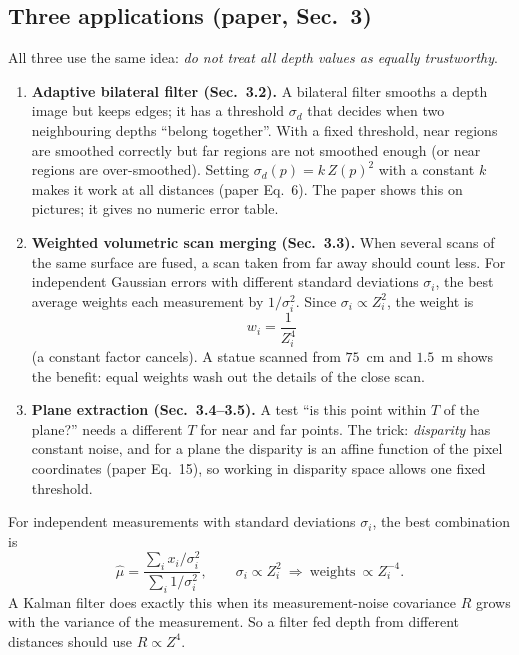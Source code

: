 \documentclass[11pt,a4paper]{article}
\begin{document}
\subsection{Three applications (paper, Sec.~3)}
\label{sec:apps}
All three use the same idea: \emph{do not treat all depth values as equally trustworthy}.
\begin{enumerate}
\item \textbf{Adaptive bilateral filter (Sec.~3.2).} A bilateral filter smooths a depth image but
keeps edges; it has a threshold $\sigma_d$ that decides when two neighbouring depths ``belong
together''. With a fixed threshold, near regions are smoothed correctly but far regions are not
smoothed enough (or near regions are over-smoothed). Setting $\sigma_d(p)=k\,Z(p)^2$ with a
constant $k$ makes it work at all distances (paper Eq.~6). The paper shows this on pictures; it
gives no numeric error table.
\item \textbf{Weighted volumetric scan merging (Sec.~3.3).} When several scans of the same
surface are fused, a scan taken from far away should count less. For independent Gaussian errors
with different standard deviations $\sigma_i$, the best average weights each measurement by
$1/\sigma_i^2$. Since $\sigma_i\propto Z_i^2$, the weight is
\[
w_i=\frac{1}{Z_i^{4}} \tag{paper Eq.~13}
\]
(a constant factor cancels). A statue scanned from $75$~cm and $1.5$~m shows the benefit: equal
weights wash out the details of the close scan.
\item \textbf{Plane extraction (Sec.~3.4--3.5).} A test ``is this point within $T$ of the plane?''
needs a different $T$ for near and far points. The trick: \emph{disparity} has constant noise, and
for a plane the disparity is an affine function of the pixel coordinates (paper Eq.~15), so
working in disparity space allows one fixed threshold.
\end{enumerate}

\begin{eqbox}
For independent measurements with standard deviations $\sigma_i$, the best combination is
\[
\hat\mu=\frac{\sum_i x_i/\sigma_i^{2}}{\sum_i 1/\sigma_i^{2}},\qquad \sigma_i\propto Z_i^2
\ \Rightarrow\ \text{weights}\ \propto Z_i^{-4}.
\]
A Kalman filter does exactly this when its measurement-noise covariance $R$ grows with the
variance of the measurement. So a filter fed depth from different distances should use
$R\propto Z^{4}$.
\end{eqbox}
\end{document}

